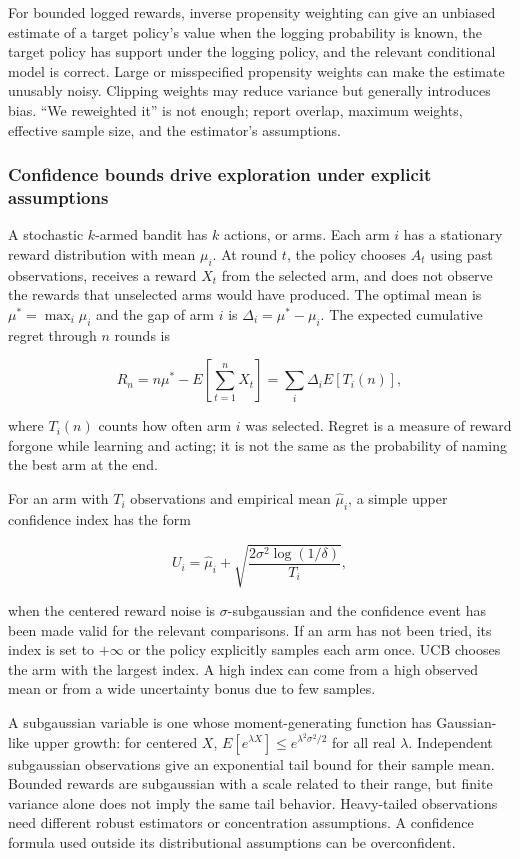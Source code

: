 For bounded logged rewards, inverse propensity weighting can give an unbiased estimate of a target policy's value when the logging probability is known, the target policy has support under the logging policy, and the relevant conditional model is correct. Large or misspecified propensity weights can make the estimate unusably noisy. Clipping weights may reduce variance but generally introduces bias. ``We reweighted it'' is not enough; report overlap, maximum weights, effective sample size, and the estimator's assumptions.

\subsubsection{Confidence bounds drive exploration under explicit assumptions}\label{confidence-bounds-drive-exploration-under-explicit-assumptions}

A stochastic \(k\)-armed bandit has \(k\) actions, or arms. Each arm \(i\) has a stationary reward distribution with mean \(\mu_i\). At round \(t\), the policy chooses \(A_t\) using past observations, receives a reward \(X_t\) from the selected arm, and does not observe the rewards that unselected arms would have produced. The optimal mean is \(\mu^*=\max_i\mu_i\) and the gap of arm \(i\) is \(\Delta_i=\mu^*-\mu_i\). The expected cumulative regret through \(n\) rounds is

\[
R_n=n\mu^*-E\left[\sum_{t=1}^n X_t\right]
=\sum_i\Delta_i E[T_i(n)],
\]

where \(T_i(n)\) counts how often arm \(i\) was selected. Regret is a measure of reward forgone while learning and acting; it is not the same as the probability of naming the best arm at the end.

For an arm with \(T_i\) observations and empirical mean \(\hat\mu_i\), a simple upper confidence index has the form

\[
U_i=\hat\mu_i+\sqrt{\frac{2\sigma^2\log(1/\delta)}{T_i}},
\]

when the centered reward noise is \(\sigma\)-subgaussian and the confidence event has been made valid for the relevant comparisons. If an arm has not been tried, its index is set to \(+\infty\) or the policy explicitly samples each arm once. UCB chooses the arm with the largest index. A high index can come from a high observed mean or from a wide uncertainty bonus due to few samples.

A subgaussian variable is one whose moment-generating function has Gaussian-like upper growth: for centered \(X\), \(E[e^{\lambda X}]\le e^{\lambda^2\sigma^2/2}\) for all real \(\lambda\). Independent subgaussian observations give an exponential tail bound for their sample mean. Bounded rewards are subgaussian with a scale related to their range, but finite variance alone does not imply the same tail behavior. Heavy-tailed observations need different robust estimators or concentration assumptions. A confidence formula used outside its distributional assumptions can be overconfident.

